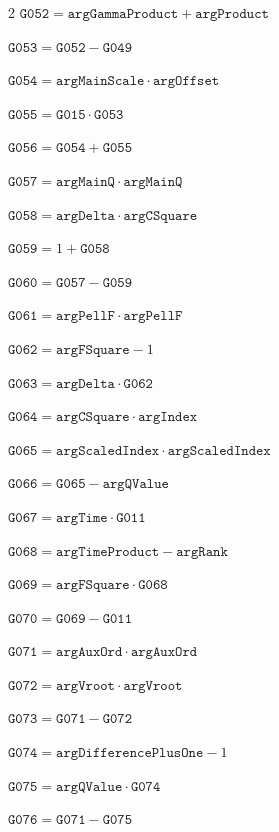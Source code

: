\documentclass[10pt]{article}
\begin{document}
\begin{multicols}{2}
\noindent $\mathtt{G052}=\mathtt{argGammaProduct}+\mathtt{argProduct}$\par
\noindent $\mathtt{G053}=\mathtt{G052}-\mathtt{G049}$\par
\noindent $\mathtt{G054}=\mathtt{argMainScale}\cdot \mathtt{argOffset}$\par
\noindent $\mathtt{G055}=\mathtt{G015}\cdot \mathtt{G053}$\par
\noindent $\mathtt{G056}=\mathtt{G054}+\mathtt{G055}$\par
\noindent $\mathtt{G057}=\mathtt{argMainQ}\cdot \mathtt{argMainQ}$\par
\noindent $\mathtt{G058}=\mathtt{argDelta}\cdot \mathtt{argCSquare}$\par
\noindent $\mathtt{G059}=1+\mathtt{G058}$\par
\noindent $\mathtt{G060}=\mathtt{G057}-\mathtt{G059}$\par
\noindent $\mathtt{G061}=\mathtt{argPellF}\cdot \mathtt{argPellF}$\par
\noindent $\mathtt{G062}=\mathtt{argFSquare}-1$\par
\noindent $\mathtt{G063}=\mathtt{argDelta}\cdot \mathtt{G062}$\par
\noindent $\mathtt{G064}=\mathtt{argCSquare}\cdot \mathtt{argIndex}$\par
\noindent $\mathtt{G065}=\mathtt{argScaledIndex}\cdot \mathtt{argScaledIndex}$\par
\noindent $\mathtt{G066}=\mathtt{G065}-\mathtt{argQValue}$\par
\noindent $\mathtt{G067}=\mathtt{argTime}\cdot \mathtt{G011}$\par
\noindent $\mathtt{G068}=\mathtt{argTimeProduct}-\mathtt{argRank}$\par
\noindent $\mathtt{G069}=\mathtt{argFSquare}\cdot \mathtt{G068}$\par
\noindent $\mathtt{G070}=\mathtt{G069}-\mathtt{G011}$\par
\noindent $\mathtt{G071}=\mathtt{argAuxOrd}\cdot \mathtt{argAuxOrd}$\par
\noindent $\mathtt{G072}=\mathtt{argVroot}\cdot \mathtt{argVroot}$\par
\noindent $\mathtt{G073}=\mathtt{G071}-\mathtt{G072}$\par
\noindent $\mathtt{G074}=\mathtt{argDifferencePlusOne}-1$\par
\noindent $\mathtt{G075}=\mathtt{argQValue}\cdot \mathtt{G074}$\par
\noindent $\mathtt{G076}=\mathtt{G071}-\mathtt{G075}$\par

\end{multicols}
\end{document}
